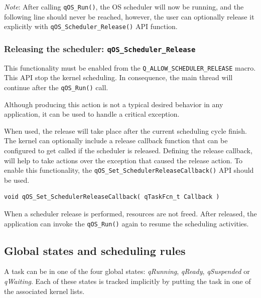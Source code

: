 \documentclass{article}
\begin{document}
\begin{tcolorbox}
\ArrowBoldDownRight \textit{Note}: After calling \lstinline{qOS_Run()}, the OS scheduler will now be running, and the following line should never be reached, however, the user can optionally release it explicitly with \lstinline{qOS_Scheduler_Release()} API function.
\end{tcolorbox}

\subsubsection{Releasing the scheduler: \lstinline{qOS_Scheduler_Release} }
This functionality must be enabled from the \lstinline{Q_ALLOW_SCHEDULER_RELEASE} macro.
This API  stop the kernel scheduling. In consequence, the main thread will continue after the \lstinline{qOS_Run()} call. 

Although producing this action is not a typical desired behavior in any application, it can be used to handle a critical exception.

When used, the release will take place after the current scheduling cycle finish. The kernel can optionally include a release callback function that can be configured to get called if the scheduler is released. 
Defining the release callback,  will help to take actions over the exception that caused the release action. To enable this functionality, the \lstinline{qOS_Set_SchedulerReleaseCallback()}  API should be used. \\

\begin{lstlisting}[style=CStyle]
void qOS_Set_SchedulerReleaseCallback( qTaskFcn_t Callback )
\end{lstlisting}

\begin{tcolorbox}
\HandRight When a scheduler release is performed, resources are not freed. After released, the application can invoke the \lstinline{qOS_Run()} again to resume the scheduling activities.
\end{tcolorbox}

\subsection{Global states and scheduling rules}

A task can be in one of the four global states: \textit{qRunning}, \textit{qReady}, \textit{qSuspended} or \textit{qWaiting}. Each of these states is tracked implicitly by putting the task in one of the associated kernel lists. 
\end{document}
